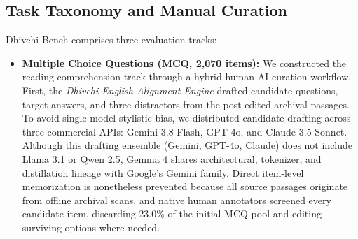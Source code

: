 \documentclass[acmsmall,review,anonymous]{acmart}
\begin{document}
\subsection{Task Taxonomy and Manual Curation}
\label{sec:taxonomy}
Dhivehi-Bench comprises three evaluation tracks:
\begin{itemize}
    \item \textbf{Multiple Choice Questions (MCQ, 2,070 items):} We constructed the reading comprehension track through a hybrid human-AI curation workflow. First, the \textit{Dhivehi-English Alignment Engine} drafted candidate questions, target answers, and three distractors from the post-edited archival passages. To avoid single-model stylistic bias, we distributed candidate drafting across three commercial APIs: Gemini 3.8 Flash, GPT-4o, and Claude 3.5 Sonnet. Although this drafting ensemble (Gemini, GPT-4o, Claude) does not include Llama 3.1 or Qwen 2.5, Gemma 4 shares architectural, tokenizer, and distillation lineage with Google's Gemini family. Direct item-level memorization is nonetheless prevented because all source passages originate from offline archival scans, and native human annotators screened every candidate item, discarding 23.0\% of the initial MCQ pool and editing surviving options where needed.


\end{itemize}
\end{document}
